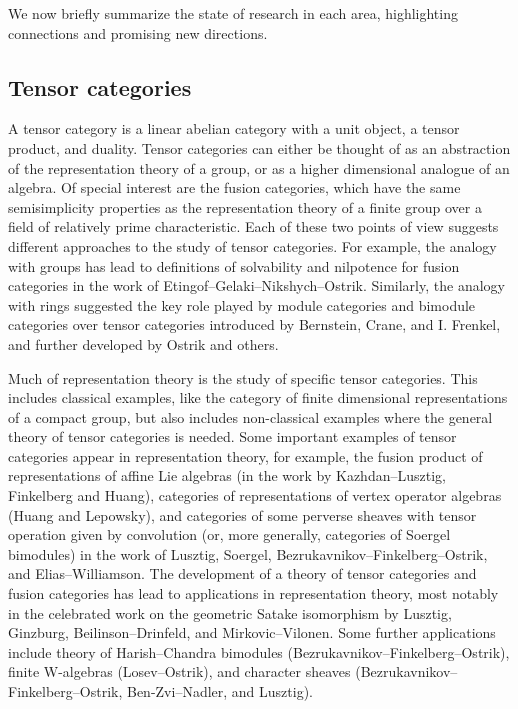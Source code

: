 \documentclass[12pt]{article}
\begin{document}
We now briefly summarize the state of research in each area, highlighting connections and promising new directions.

\subsection{Tensor categories}
A tensor category is a linear abelian category with a unit object, a tensor product, and duality. Tensor categories can either be thought of as an abstraction of the representation theory of a group, or as a higher dimensional analogue of an algebra. Of special interest are the fusion categories, which have the same semisimplicity properties as the representation theory of a finite group over a field of relatively prime characteristic.  Each of these two points of view suggests different approaches to the study of tensor categories. For example, the analogy with groups has lead to definitions of solvability and nilpotence for fusion categories in the work of Etingof--Gelaki--Nikshych--Ostrik.  Similarly, the analogy with rings suggested the key role played by module categories and bimodule categories over tensor categories introduced by Bernstein, Crane, and I. Frenkel, and further developed by Ostrik and others.

Much of representation theory is the study of specific tensor categories. This includes classical examples, like the category of finite dimensional representations of a compact group, but also includes non-classical examples where the general theory of tensor categories is needed.  Some important examples of tensor categories appear in representation theory, for example, the fusion product of representations of affine Lie algebras (in the work by Kazhdan--Lusztig, Finkelberg and Huang), categories of representations of vertex operator algebras (Huang and Lepowsky), and categories of some perverse sheaves with tensor operation given by convolution (or, more generally, categories of Soergel bimodules) in the work of Lusztig, Soergel, Bezrukavnikov--Finkelberg--Ostrik, and Elias--Williamson. The development of a theory of tensor categories and fusion categories has lead to applications in representation theory, most notably in the celebrated work on the geometric Satake isomorphism by Lusztig, Ginzburg, Beilinson--Drinfeld, and Mirkovic--Vilonen. Some further applications include theory of Harish--Chandra bimodules (Bezrukavnikov--Finkelberg--Ostrik), finite W-algebras (Losev--Ostrik), and character sheaves (Bezrukavnikov--Finkelberg--Ostrik, Ben-Zvi--Nadler, and Lusztig).
\end{document}
